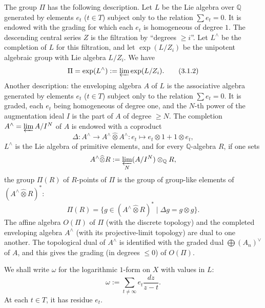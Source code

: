 \documentclass[10pt]{article}
\newcommand{\Q}{\mathbb Q}
\begin{document}
The group $\Pi$ has the following description.
Let $L$ be the Lie algebra over $\Q$ generated by elements $e_t$ ($t\in T$) subject only to the relation $\sum e_t=0$.
It is endowed with the grading for which each $e_t$ is homogeneous of degree $1$.
The descending central series $Z$ is the filtration by ``degrees $\geq i$''.
Let $L^\wedge$ be the completion of $L$ for this filtration, and let $\exp(L/Z_i)$ be the unipotent algebraic group with Lie algebra $L/Z_i$.
We have
\begin{equation}
\Pi=\exp(L^\wedge):=\varprojlim \exp(L/Z_i).
\tag{3.1.2}
\end{equation}
Another description: the enveloping algebra $A$ of $L$ is the associative algebra generated by elements $e_t$ ($t\in T$) subject only to the relation $\sum e_t=0$.
It is graded, each $e_t$ being homogeneous of degree one, and the $N$-th power of the augmentation ideal $I$ is the part of $A$ of degree $\geq N$.
The completion $A^\wedge=\varprojlim A/I^N$ of $A$ is endowed with a coproduct
\[
 \Delta:A^\wedge\to A^\wedge\widehat\otimes A^\wedge:
 e_t\longmapsto e_t\otimes1+1\otimes e_t,
\]
$L^\wedge$ is the Lie algebra of primitive elements, and for every $\Q$-algebra $R$, if one sets
\[
 A^\wedge\widehat\otimes R:=\varprojlim_N (A/I^N)\otimes_\Q R,
\]
the group $\Pi(R)$ of $R$-points of $\Pi$ is the group of group-like elements of $(A^\wedge\widehat\otimes R)^*$:
\begin{equation}
\Pi(R)=\{g\in(A^\wedge\widehat\otimes R)^*\mid \Delta g=g\otimes g\}.
\tag{3.1.3}
\end{equation}
The affine algebra $O(\Pi)$ of $\Pi$ (with the discrete topology) and the completed enveloping algebra $A^\wedge$ (with its projective-limit topology) are dual to one another.
The topological dual of $A^\wedge$ is identified with the graded dual $\bigoplus(A_n)^\vee$ of $A$, and this gives the grading (in degrees $\leq0$) of $O(\Pi)$.

We shall write $\omega$ for the logarithmic $1$-form on $X$ with values in $L$:
\begin{equation}
 \omega:=\sum_{t\ne\infty} e_t\frac{dz}{z-t}.
\tag{3.1.4}
\end{equation}
At each $t\in T$, it has residue $e_t$.
\end{document}
